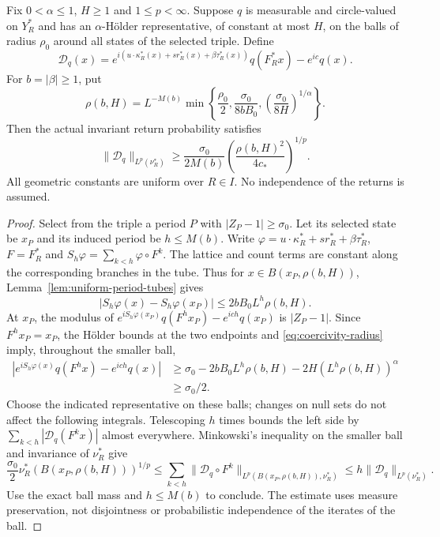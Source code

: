 \begin{theorem}
\label{thm:positive-measure-coercivity}
Fix $0<\alpha\le1$, $H\ge1$ and $1\le p<\infty$. Suppose $q$ is
measurable and circle-valued on $Y_R^*$ and has an $\alpha$-H\"older
representative, of constant at most $H$, on the balls of radius
$\rho_0$ around all states of the selected triple. Define
\[
 \mathcal D_q(x)=e^{i(u\cdot\kappa_R^*(x)+s r_R^*(x)+\beta\tau_R^*(x))}
                      q(F_R^*x)-e^{ic}q(x).
\]
For $b=|\beta|\ge1$, put
\begin{equation}\label{eq:coercivity-radius}
 \rho(b,H)=L^{-M(b)}
 \min\left\{\frac{\rho_0}{2},\frac{\sigma_0}{8bB_0},
                       \left(\frac{\sigma_0}{8H}\right)^{1/\alpha}\right\}.
\end{equation}
Then the actual invariant return probability satisfies
\begin{equation}\label{eq:positive-measure-coercivity}
 \|\mathcal D_q\|_{L^p(\nu_R^*)}
 \ge\frac{\sigma_0}{2M(b)}
             \left(\frac{\rho(b,H)^2}{4c_*}\right)^{1/p}.
\end{equation}
All geometric constants are uniform over $R\in I$. No independence
of the returns is assumed.
\end{theorem}
\begin{proof}
Select from the triple a period $P$ with $|Z_P-1|\ge\sigma_0$.
Let its selected state be $x_P$ and its induced period be $h\le M(b)$.
Write $\varphi=u\cdot\kappa_R^*+s r_R^*+\beta\tau_R^*$, $F=F_R^*$
and $S_h\varphi=\sum_{k<h}\varphi\circ F^k$. The lattice and count
terms are constant along the corresponding branches in the tube.
Thus for $x\in B(x_P,\rho(b,H))$, Lemma~\ref{lem:uniform-period-tubes}
gives
\[
 |S_h\varphi(x)-S_h\varphi(x_P)|\le2bB_0L^h\rho(b,H).
\]
At $x_P$, the modulus of
$e^{iS_h\varphi(x_P)}q(F^h x_P)-e^{ich}q(x_P)$ is $|Z_P-1|$.
Since $F^h x_P=x_P$, the H\"older bounds at the two endpoints and
\eqref{eq:coercivity-radius} imply, throughout the smaller ball,
\begin{align*}
 \left|e^{iS_h\varphi(x)}q(F^h x)-e^{ich}q(x)\right|
 &\ge\sigma_0-2bB_0L^h\rho(b,H)-2H(L^h\rho(b,H))^\alpha\\
 &\ge\sigma_0/2.
\end{align*}
Choose the indicated representative on these balls; changes on null
sets do not affect the following integrals. Telescoping $h$ times
bounds the left side by $\sum_{k<h}|\mathcal D_q(F^k x)|$ almost
everywhere. Minkowski's inequality on the smaller ball and invariance
of $\nu_R^*$ give
\[
 \frac{\sigma_0}{2}\nu_R^*(B(x_P,\rho(b,H)))^{1/p}
 \le\sum_{k<h}\|\mathcal D_q\circ F^k\|_{L^p(B(x_P,\rho(b,H)),\nu_R^*)}
 \le h\|\mathcal D_q\|_{L^p(\nu_R^*)}.
\]
Use the exact ball mass and $h\le M(b)$ to conclude. The estimate
uses measure preservation, not disjointness or probabilistic
independence of the iterates of the ball.
\end{proof}

